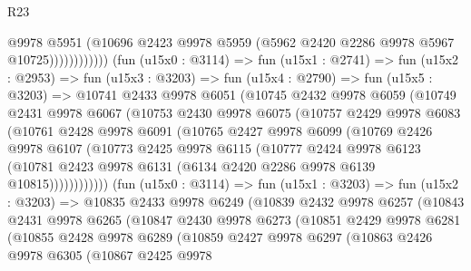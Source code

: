\begin{lexlean}{R23}
\begin{coremodule}
                            @9978
                            @5951
                            (@10696
                              @2423
                              @9978
                              @5959
                              (@5962 @2420 @2286 @9978 @5967 @10725))))))))))))
        (fun (u15x0 : @3114) =>
        fun (u15x1 : @2741) =>
        fun (u15x2 : @2953) =>
        fun (u15x3 : @3203) =>
        fun (u15x4 : @2790) =>
        fun (u15x5 : @3203) =>
        @10741
          @2433
          @9978
          @6051
          (@10745
            @2432
            @9978
            @6059
            (@10749
              @2431
              @9978
              @6067
              (@10753
                @2430
                @9978
                @6075
                (@10757
                  @2429
                  @9978
                  @6083
                  (@10761
                    @2428
                    @9978
                    @6091
                    (@10765
                      @2427
                      @9978
                      @6099
                      (@10769
                        @2426
                        @9978
                        @6107
                        (@10773
                          @2425
                          @9978
                          @6115
                          (@10777
                            @2424
                            @9978
                            @6123
                            (@10781
                              @2423
                              @9978
                              @6131
                              (@6134 @2420 @2286 @9978 @6139 @10815))))))))))))
        (fun (u15x0 : @3114) =>
        fun (u15x1 : @3203) =>
        fun (u15x2 : @3203) =>
        @10835
          @2433
          @9978
          @6249
          (@10839
            @2432
            @9978
            @6257
            (@10843
              @2431
              @9978
              @6265
              (@10847
                @2430
                @9978
                @6273
                (@10851
                  @2429
                  @9978
                  @6281
                  (@10855
                    @2428
                    @9978
                    @6289
                    (@10859
                      @2427
                      @9978
                      @6297
                      (@10863
                        @2426
                        @9978
                        @6305
                        (@10867
                          @2425
                          @9978

\end{coremodule}
\end{lexlean}
